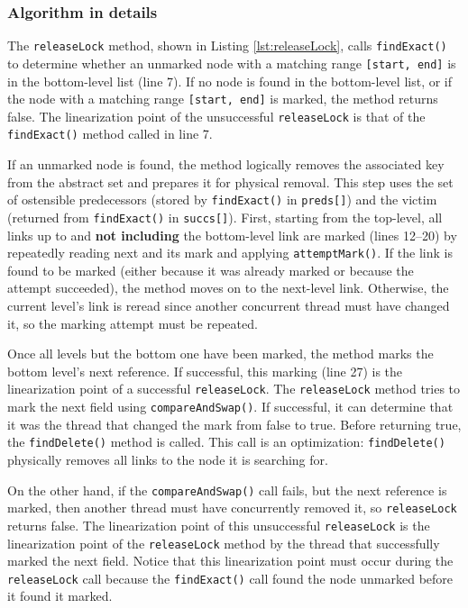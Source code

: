 \subsubsection*{Algorithm in details}

The \texttt{releaseLock} method, shown in Listing \ref{lst:releaseLock}, calls \texttt{findExact()} to determine whether an unmarked node with a matching range \texttt{[start, end]} is in the bottom-level list (line 7). 
If no node is found in the bottom-level list, or if the node with a matching range \texttt{[start, end]} is marked, the method returns false. 
The linearization point of the unsuccessful \texttt{releaseLock} is that of the \texttt{findExact()} method called in line 7. 

If an unmarked node is found, the method logically removes the associated key from the abstract set and prepares it for physical removal. 
This step uses the set of ostensible predecessors (stored by \texttt{findExact()} in \texttt{preds[]}) and the victim (returned from \texttt{findExact()} in \texttt{succs[]}). 
First, starting from the top-level, all links up to and \textbf{not including} the bottom-level link are marked (lines 12--20) by repeatedly reading next and its mark and applying \texttt{attemptMark()}. 
If the link is found to be marked (either because it was already marked or because the attempt succeeded), the method moves on to the next-level link. 
Otherwise, the current level's link is reread since another concurrent thread must have changed it, so the marking attempt must be repeated. 

Once all levels but the bottom one have been marked, the method marks the bottom level's next reference. 
If successful, this marking (line 27) is the linearization point of a successful \texttt{releaseLock}. 
The \texttt{releaseLock} method tries to mark the next field using \texttt{compareAndSwap()}. 
If successful, it can determine that it was the thread that changed the mark from false to true. 
Before returning true, the \texttt{findDelete()} method is called. 
This call is an optimization: \texttt{findDelete()} physically removes all links to the node it is searching for.

On the other hand, if the  \texttt{compareAndSwap()} call fails, but the next reference is marked, then another thread must have concurrently removed it, so \texttt{releaseLock} returns false. 
The linearization point of this unsuccessful \texttt{releaseLock} is the linearization point of the \texttt{releaseLock} method by the thread that successfully marked the next field. 
Notice that this linearization point must occur during the \texttt{releaseLock} call because the \texttt{findExact()} call found the node unmarked before it found it marked.

